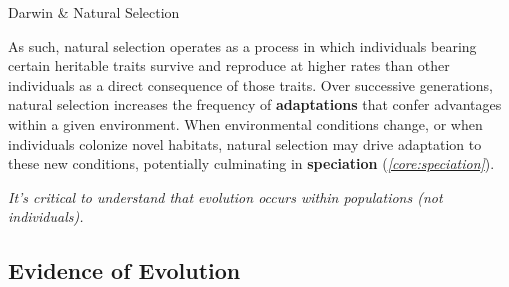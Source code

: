 \documentclass[10pt]{article}
\begin{document}
\begin{core}[label=core:darwin]{Darwin \& Natural Selection}
\begin{enumerate}
      \end{enumerate}

      As such, natural selection operates as a process in which individuals bearing certain heritable traits survive and reproduce at higher rates than other individuals as a direct consequence of those traits. Over successive generations, natural selection increases the frequency of \textbf{adaptations} that confer advantages within a given environment. When environmental conditions change, or when individuals colonize novel habitats, natural selection may drive adaptation to these new conditions, potentially culminating in \textbf{speciation} (\textit{\autoref{core:speciation}}).

      \textit{It's critical to understand that evolution occurs within populations (not individuals).}

    \end{core}

  \subsection{Evidence of Evolution}
\end{document}
